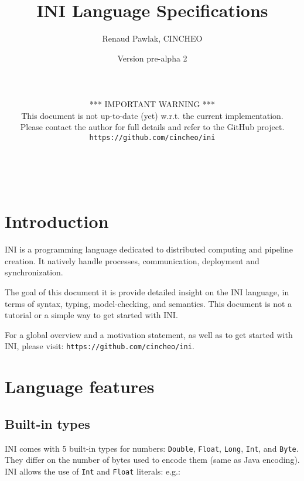\documentclass[11pt]{report}
\begin{document}
\thispagestyle{empty}

\title{INI Language Specifications}
\author{Renaud Pawlak, CINCHEO}

\date{Version pre-alpha 2\\
~\\
~\\
~\\
*** IMPORTANT WARNING ***\\
This document is not up-to-date (yet) w.r.t. the current implementation.\\
Please contact the author for full details and refer to the GitHub project.\\ \texttt{https://github.com/cincheo/ini}
}
\maketitle
\

\tableofcontents

\chapter*{Introduction}

INI is a programming language dedicated to distributed computing and pipeline creation. It natively handle processes, communication, deployment and synchronization. 

The goal of this document it is provide detailed insight on the INI language, in terms of syntax, typing, model-checking, and semantics. This document is not a tutorial or a simple way to get started with INI.

For a global overview and a motivation statement, as well as to get started with INI, please visit: \texttt{https://github.com/cincheo/ini}.

\chapter{Language features}

\section{Built-in types}

INI comes with 5 built-in types for numbers: \texttt{Double}, \texttt{Float}, \texttt{Long}, \texttt{Int}, and \texttt{Byte}. They differ on the number of bytes used to encode them (same as Java encoding). INI allows the use of \texttt{Int} and \texttt{Float} literals: e.g.:
\end{document}
